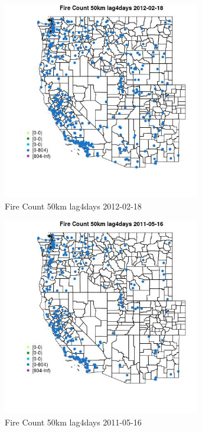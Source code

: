 \begin{figure} 
\centering  
\includegraphics[width=0.77\textwidth]{Code_Outputs/Report_ML_input_PM25_Step4_part_f_de_duplicated_aves_prioritize_24hr_obswNAs_MapObsFire_Count_50km_lag4days2012-02-18.jpg} 
\caption{\label{fig:Report_ML_input_PM25_Step4_part_f_de_duplicated_aves_prioritize_24hr_obswNAsMapObsFire_Count_50km_lag4days2012-02-18}Fire Count 50km lag4days 2012-02-18} 
\end{figure} 
 

\begin{figure} 
\centering  
\includegraphics[width=0.77\textwidth]{Code_Outputs/Report_ML_input_PM25_Step4_part_f_de_duplicated_aves_prioritize_24hr_obswNAs_MapObsFire_Count_50km_lag4days2011-05-16.jpg} 
\caption{\label{fig:Report_ML_input_PM25_Step4_part_f_de_duplicated_aves_prioritize_24hr_obswNAsMapObsFire_Count_50km_lag4days2011-05-16}Fire Count 50km lag4days 2011-05-16} 
\end{figure} 
 

